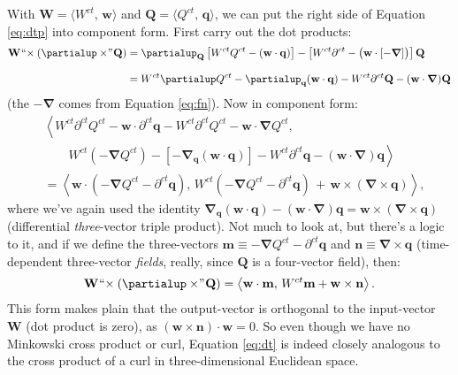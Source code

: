 \documentclass[12pt]{article}
\renewcommand{\vv}[1]{\mathbf{#1}}
\newcommand{\del}{\boldsymbol{\nabla}}
\begin{document}
With $\vv W = \langle W^{ct}, \, \vv w \rangle$ and $\vv Q = \langle Q^{ct} , \, \vv q \rangle$, we can put the right side of Equation \ref{eq:dtp} into component form. First carry out the dot products:
\begin{equation*}
\begin{split}
\vv W \mkern1mu `` \mkern-4mu \times (\partialup \times \mkern-4mu " \mkern1mu \vv Q) &= \partialup_{\vv Q} \left[ W^{ct} Q^{ct} - \left( \vv w \cdot \vv q \right) \right] - \left[ W^{ct} \partial^{ct} - \big(  \vv w \cdot [ - \del ] \big) \right] \vv Q \\[8pt]
&= W^{ct} \partialup Q^{ct} - \partialup_{\vv q} ( \vv w \cdot \vv q ) - W^{ct} \partial^{ct} \vv Q - ( \vv w \cdot \del ) \vv Q
\end{split}
\end{equation*}
(the $-\del$ comes from Equation \ref{eq:fn}). Now in component form:
\begin{equation*}
\begin{split}
& \left \langle W^{ct} \partial^{ct} Q^{ct} - \vv w \cdot \partial^{ct} \vv q - W^{ct} \partial^{ct} Q^{ct} - \vv w \cdot \del Q^{ct} , \right. \\[3pt]
& \qquad \left. W^{ct} (- \del Q^{ct}) - [- \del_{\vv q} (\vv w \cdot \vv q)]  -  W^{ct} \partial^{ct} \vv q - (\vv w \cdot \del) \vv q \right \rangle \\[10pt]
&= \left \langle \vv w \cdot \left( - \del Q^{ct} - \partial^{ct} \vv q  \right) , \, W^{ct} \left( - \del Q^{ct} - \partial^{ct} \vv q \right) \, + \, \vv w \times (\del \times \vv q) \right \rangle ,
\end{split}
\end{equation*}
where we've again used the identity $\del_{\vv q} (\vv w \cdot \vv q) - (\vv w \cdot \del) \vv q = \vv w \times (\del \times \vv q)$ (differential \emph{three}-vector triple product). Not much to look at, but there's a logic to it, and if we define the three-vectors ${\vv m \equiv - \del Q^{ct} - \partial^{ct} \vv q}$ and ${\vv n \equiv \del \times \vv q}$ (time-dependent three-vector \emph{fields}, really, since $\vv Q$ is a four-vector field), then:
\begin{equation}\label{eq:dt}
\vv W \mkern1mu `` \mkern-4mu \times (\partialup \times \mkern-4mu " \mkern1mu \vv Q) = \left \langle \vv w \cdot \vv m , \, W^{ct} \vv m + \vv w \times \vv n \right \rangle .
\end{equation}
This form makes plain that the output-vector is orthogonal to the input-vector $\vv W$ (dot product is zero), as $(\vv w \times \vv n) \cdot \vv w = 0$. So even though we have no Minkowski cross product or curl, Equation \ref{eq:dt} is indeed closely analogous to the cross product of a curl in three-dimensional Euclidean space.
\end{document}

